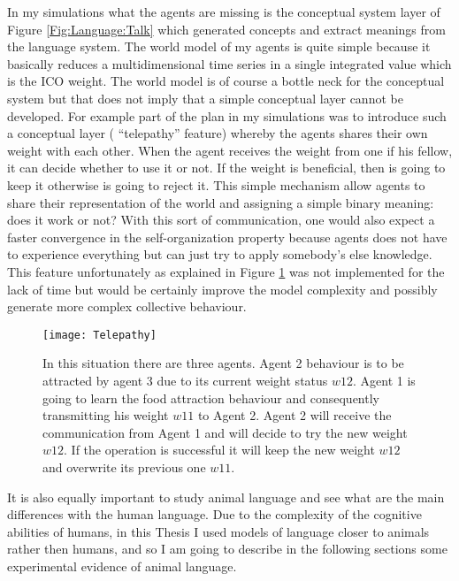 In my simulations what the agents are missing is the conceptual system layer
of Figure \ref{Fig:Language:Talk} which generated concepts and extract meanings
from the language system.
The world model of my agents is quite simple because it basically reduces a multidimensional
time series in a single integrated value which is the ICO weight.
The world model is of course a bottle neck for the conceptual system but that
does not imply that a simple conceptual layer cannot be developed.
For example part of the plan in my simulations was to introduce such a conceptual layer ( ``telepathy'' feature) whereby the agents shares their own weight with each other.
When the agent receives the weight from one if his fellow, it can decide whether
to use it or not.
If the weight is beneficial, then is going to keep it otherwise is going to reject it.
This simple mechanism allow agents to share their representation of the world
and assigning a simple binary meaning: does it work or not?
With this sort of communication, one would also expect a faster convergence in the
self-organization property because agents does not have to experience everything
but can just try to apply somebody's else knowledge.
This feature unfortunately as explained in Figure \ref{Fig:Language:Telepahty}
was not implemented for the lack of time but would be
certainly improve the model complexity and possibly generate more complex collective
behaviour. 

\begin{figure}[htbp]
\begin{center}
\texttt{[image: Telepathy]}
\end{center}
\small{
\caption[More advanced language model]{
In this situation there are three agents.
Agent 2 behaviour is to be attracted by agent 3 due to its current weight status $w12$.
Agent 1 is going to learn the food attraction behaviour and consequently
transmitting his weight $w11$ to Agent 2.
Agent 2 will receive the communication from Agent 1 and will decide to try
the new weight $w12$.
If the operation is successful it will keep the new weight $w12$ and overwrite
its previous one $w11$.
\label{Fig:Language:Telepahty}}}
\end{figure}


It is also equally important to study animal language and see what are the
main differences with the human language.
Due to the complexity of the cognitive abilities of humans, in this Thesis
I used models of language closer to animals rather then
humans, and so I am going to describe in the following sections some experimental
evidence of animal language.

